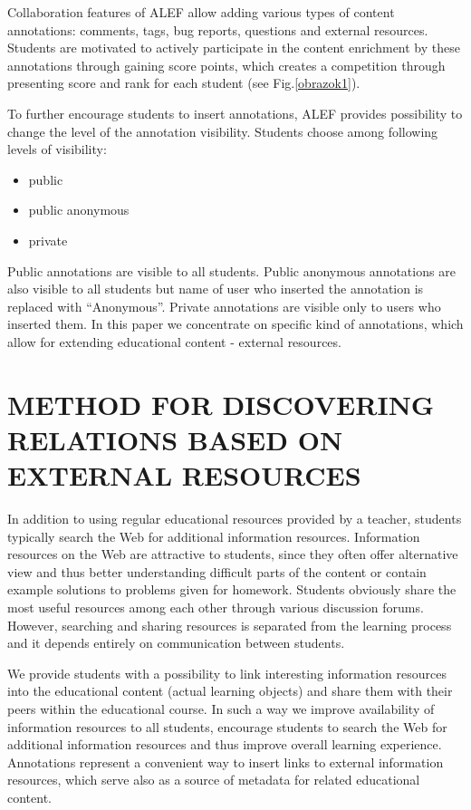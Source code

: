 \documentclass[a4, conference]{IEEEtran}
\begin{document}
Collaboration features of ALEF allow adding various types of content annotations: comments, tags, bug reports, questions and external resources. Students are motivated to actively participate in the content enrichment by these annotations through gaining score points, which creates a competition through presenting score and rank for each student (see Fig.\ref{obrazok1}).%

To further encourage students to insert annotations, ALEF provides possibility to change the level of the annotation visibility. Students choose among following levels of visibility:
\begin{itemize}%
\item public 
\item public anonymous 
\item private 
\end{itemize}
Public annotations are visible to all students. Public anonymous annotations are also visible to all students but name of user who inserted the annotation is replaced with ``Anonymous''. Private annotations are visible only to users who inserted them. In this paper we concentrate on specific kind of annotations, which allow for extending educational content - external resources.  
\section{METHOD FOR DISCOVERING RELATIONS BASED ON EXTERNAL RESOURCES}%
%  
In addition to using regular educational resources provided by a teacher, students typically search the Web for additional information resources. Information resources on the Web are attractive to students, since they often offer alternative view and thus better understanding difficult parts of the content or contain example solutions to problems given for homework. Students obviously share the most useful resources among each other through various discussion forums. However, searching and sharing resources is separated from the learning process and it depends entirely on communication between students.

We provide students with a possibility to link interesting information resources into the educational content (actual learning objects) and share them with their peers within the educational course. In such a way we improve availability of information resources to all students, encourage students to search the Web for additional information resources and thus improve overall learning experience. Annotations represent a convenient way to insert links to external information resources, which serve also as a source of metadata for related educational content.
\end{document}
